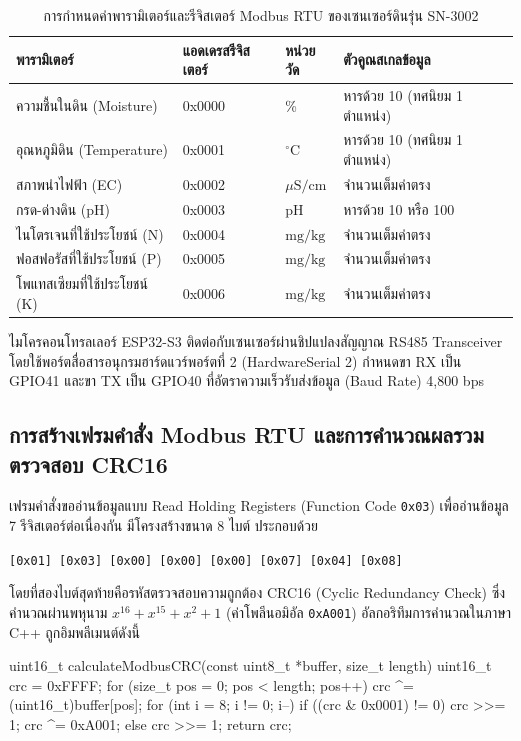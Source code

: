 \begin{table}[htbp]
    \caption{การกำหนดค่าพารามิเตอร์และรีจิสเตอร์ Modbus RTU ของเซนเซอร์ดินรุ่น SN-3002}
    \label{tab:modbus_specs}
    \begin{tabularx}{\textwidth}{p{3.8cm}p{2.8cm}p{2.5cm}Y}
        \toprule
        \textbf{พารามิเตอร์} & \textbf{แอดเดรสรีจิสเตอร์} & \textbf{หน่วยวัด} & \textbf{ตัวคูณสเกลข้อมูล} \\
        \midrule
        ความชื้นในดิน (Moisture) & 0x0000 & \% & หารด้วย 10 (ทศนิยม 1 ตำแหน่ง) \\
        อุณหภูมิดิน (Temperature) & 0x0001 & $^\circ\text{C}$ & หารด้วย 10 (ทศนิยม 1 ตำแหน่ง) \\
        สภาพนำไฟฟ้า (EC) & 0x0002 & $\mu\text{S/cm}$ & จำนวนเต็มค่าตรง \\
        กรด-ด่างดิน (pH) & 0x0003 & pH & หารด้วย 10 หรือ 100 \\
        ไนโตรเจนที่ใช้ประโยชน์ (N) & 0x0004 & $\text{mg/kg}$ & จำนวนเต็มค่าตรง \\
        ฟอสฟอรัสที่ใช้ประโยชน์ (P) & 0x0005 & $\text{mg/kg}$ & จำนวนเต็มค่าตรง \\
        โพแทสเซียมที่ใช้ประโยชน์ (K) & 0x0006 & $\text{mg/kg}$ & จำนวนเต็มค่าตรง \\
        \bottomrule
    \end{tabularx}
\end{table}

ไมโครคอนโทรลเลอร์ ESP32-S3 ติดต่อกับเซนเซอร์ผ่านชิปแปลงสัญญาณ RS485 Transceiver โดยใช้พอร์ตสื่อสารอนุกรมฮาร์ดแวร์พอร์ตที่ 2 (HardwareSerial 2) กำหนดขา RX เป็น GPIO41 และขา TX เป็น GPIO40 ที่อัตราความเร็วรับส่งข้อมูล (Baud Rate) 4,800 bps

\subsection{การสร้างเฟรมคำสั่ง Modbus RTU และการคำนวณผลรวมตรวจสอบ CRC16}

เฟรมคำสั่งขออ่านข้อมูลแบบ Read Holding Registers (Function Code \texttt{0x03}) เพื่ออ่านข้อมูล 7 รีจิสเตอร์ต่อเนื่องกัน มีโครงสร้างขนาด 8 ไบต์ ประกอบด้วย
\begin{center}
\texttt{[0x01] [0x03] [0x00] [0x00] [0x00] [0x07] [0x04] [0x08]}
\end{center}
โดยที่สองไบต์สุดท้ายคือรหัสตรวจสอบความถูกต้อง CRC16 (Cyclic Redundancy Check) ซึ่งคำนวณผ่านพหุนาม $x^{16} + x^{15} + x^2 + 1$ (ค่าโพลีนอมิอัล \texttt{0xA001}) อัลกอริทึมการคำนวณในภาษา C++ ถูกอิมพลีเมนต์ดังนี้

\begin{pythonbox}
uint16_t calculateModbusCRC(const uint8_t *buffer, size_t length) {
    uint16_t crc = 0xFFFF;
    for (size_t pos = 0; pos < length; pos++) {
        crc ^= (uint16_t)buffer[pos];
        for (int i = 8; i != 0; i--) {
            if ((crc & 0x0001) != 0) {
                crc >>= 1;
                crc ^= 0xA001;
            } else {
                crc >>= 1;
            }
        }
    }
    return crc;
}
\end{pythonbox}

